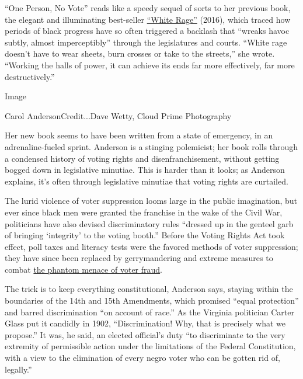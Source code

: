 ``One Person, No Vote'' reads like a speedy sequel of sorts to her
previous book, the elegant and illuminating best-seller
\href{https://www.nytimes3xbfgragh.onion/2016/06/26/books/review/white-rage-by-carol-anderson.html}{``White
Rage''} (2016), which traced how periods of black progress have so often
triggered a backlash that ``wreaks havoc subtly, almost imperceptibly''
through the legislatures and courts. ``White rage doesn't have to wear
sheets, burn crosses or take to the streets,'' she wrote. ``Working the
halls of power, it can achieve its ends far more effectively, far more
destructively.''

Image

Carol AndersonCredit...Dave Wetty, Cloud Prime Photography

Her new book seems to have been written from a state of emergency, in an
adrenaline-fueled sprint. Anderson is a stinging polemicist; her book
rolls through a condensed history of voting rights and
disenfranchisement, without getting bogged down in legislative minutiae.
This is harder than it looks; as Anderson explains, it's often through
legislative minutiae that voting rights are curtailed.

The lurid violence of voter suppression looms large in the public
imagination, but ever since black men were granted the franchise in the
wake of the Civil War, politicians have also devised discriminatory
rules ``dressed up in the genteel garb of bringing `integrity' to the
voting booth.'' Before the Voting Rights Act took effect, poll taxes and
literacy tests were the favored methods of voter suppression; they have
since been replaced by gerrymandering and extreme measures to combat
\href{https://www.nytimes3xbfgragh.onion/2014/06/11/upshot/vote-fraud-is-rare-but-myth-is-widespread.html}{the
phantom menace of voter fraud}.

The trick is to keep everything constitutional, Anderson says, staying
within the boundaries of the 14th and 15th Amendments, which promised
``equal protection'' and barred discrimination ``on account of race.''
As the Virginia politician Carter Glass put it candidly in 1902,
``Discrimination! Why, that is precisely what we propose.'' It was, he
said, an elected official's duty ``to discriminate to the very extremity
of permissible action under the limitations of the Federal Constitution,
with a view to the elimination of every negro voter who can be gotten
rid of, legally.''

